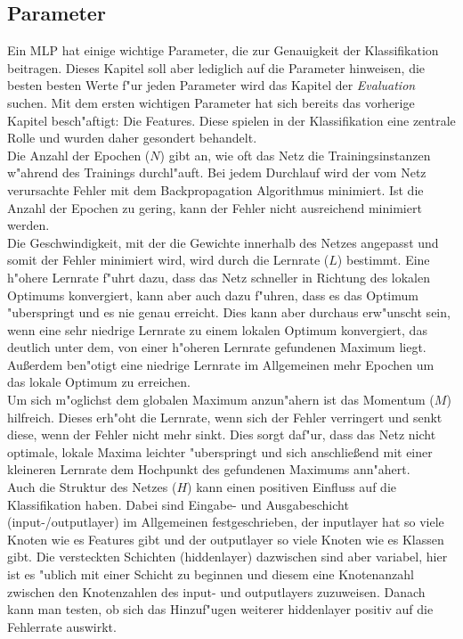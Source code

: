\subsection{Parameter}
\label{Parameter}
Ein MLP hat einige wichtige Parameter, die zur Genauigkeit der Klassifikation beitragen. Dieses Kapitel soll aber lediglich auf die Parameter hinweisen, die besten besten Werte f"ur jeden Parameter wird das Kapitel der \textit{Evaluation} suchen. Mit dem ersten wichtigen Parameter hat sich bereits das vorherige Kapitel besch"aftigt: Die Features. Diese spielen in der Klassifikation eine zentrale Rolle und wurden daher gesondert behandelt.\\
Die Anzahl der Epochen ($N$) gibt an, wie oft das Netz die Trainingsinstanzen w"ahrend des Trainings durchl"auft. Bei jedem Durchlauf wird der vom Netz verursachte Fehler mit dem Backpropagation Algorithmus minimiert. Ist die Anzahl der Epochen zu gering, kann der Fehler nicht ausreichend minimiert werden. \\
Die Geschwindigkeit, mit der die Gewichte innerhalb des Netzes angepasst und somit der Fehler minimiert wird, wird durch die Lernrate ($L$) bestimmt. Eine h"ohere Lernrate f"uhrt dazu, dass das Netz schneller in Richtung des lokalen Optimums konvergiert, kann aber auch dazu f"uhren, dass es das Optimum "uberspringt und es nie genau erreicht. Dies kann aber durchaus erw"unscht sein, wenn eine sehr niedrige Lernrate zu einem lokalen Optimum konvergiert, das deutlich unter dem, von einer h"oheren Lernrate gefundenen Maximum liegt. Au{\ss}erdem ben"otigt eine niedrige Lernrate im Allgemeinen mehr Epochen um das lokale Optimum zu erreichen. \\
Um sich m"oglichst dem globalen Maximum anzun"ahern ist das Momentum ($M$) hilfreich. Dieses erh"oht die Lernrate, wenn sich der Fehler verringert und senkt diese, wenn der Fehler nicht mehr sinkt. Dies sorgt daf"ur, dass das Netz nicht optimale, lokale Maxima leichter "uberspringt und sich anschlie{\ss}end mit einer kleineren Lernrate dem Hochpunkt des gefundenen Maximums ann"ahert.\\
Auch die Struktur des Netzes ($H$) kann einen positiven Einfluss auf die Klassifikation haben. Dabei sind Eingabe- und Ausgabeschicht (input-/outputlayer) im Allgemeinen festgeschrieben, der inputlayer hat so viele Knoten wie es Features gibt und der outputlayer so viele Knoten wie es Klassen gibt. Die versteckten Schichten (hiddenlayer) dazwischen sind aber variabel, hier ist es "ublich mit einer Schicht zu beginnen und diesem eine Knotenanzahl zwischen den Knotenzahlen des input- und outputlayers zuzuweisen. Danach kann man testen, ob sich das Hinzuf"ugen weiterer hiddenlayer positiv auf die Fehlerrate auswirkt.\\
